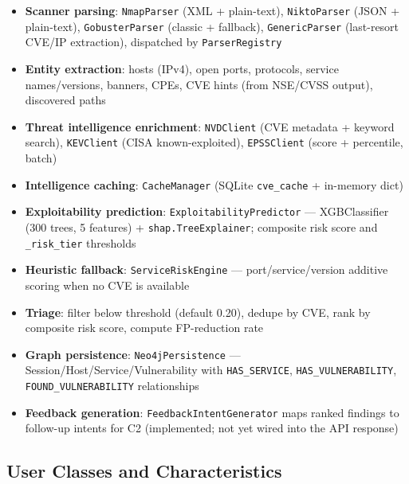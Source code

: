 \documentclass[10pt,journal,onecolumn]{IEEEtran}
\begin{document}
\begin{itemize}
\item \textbf{Scanner parsing}: \texttt{NmapParser} (XML + plain-text), \texttt{NiktoParser} (JSON + plain-text), \texttt{GobusterParser} (classic + fallback), \texttt{GenericParser} (last-resort CVE/IP extraction), dispatched by \texttt{ParserRegistry}
\item \textbf{Entity extraction}: hosts (IPv4), open ports, protocols, service names/versions, banners, CPEs, CVE hints (from NSE/CVSS output), discovered paths
\item \textbf{Threat intelligence enrichment}: \texttt{NVDClient} (CVE metadata + keyword search), \texttt{KEVClient} (CISA known-exploited), \texttt{EPSSClient} (score + percentile, batch)
\item \textbf{Intelligence caching}: \texttt{CacheManager} (SQLite \texttt{cve\_cache} + in-memory dict)
\item \textbf{Exploitability prediction}: \texttt{ExploitabilityPredictor} --- XGBClassifier (300 trees, 5 features) + \texttt{shap.TreeExplainer}; composite risk score and \texttt{\_risk\_tier} thresholds
\item \textbf{Heuristic fallback}: \texttt{ServiceRiskEngine} --- port/service/version additive scoring when no CVE is available
\item \textbf{Triage}: filter below threshold (default 0.20), dedupe by CVE, rank by composite risk score, compute FP-reduction rate
\item \textbf{Graph persistence}: \texttt{Neo4jPersistence} --- Session/Host/Service/Vulnerability with \texttt{HAS\_SERVICE}, \texttt{HAS\_VULNERABILITY}, \texttt{FOUND\_VULNERABILITY} relationships
\item \textbf{Feedback generation}: \texttt{FeedbackIntentGenerator} maps ranked findings to follow-up intents for C2 (implemented; not yet wired into the API response)
\end{itemize}

\subsection{User Classes and Characteristics}
\end{document}
